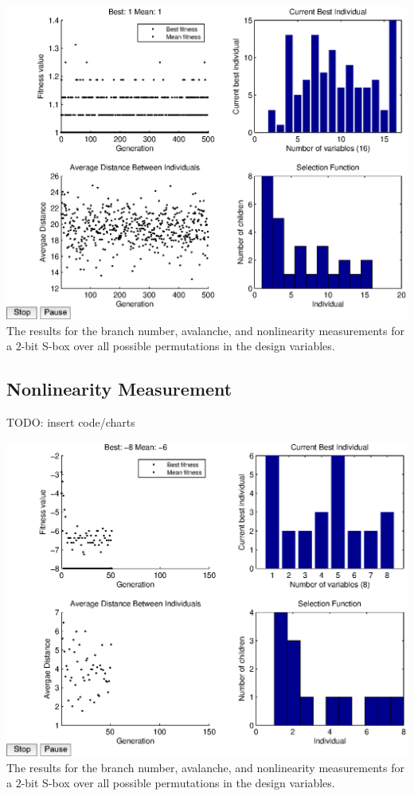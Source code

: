 \documentclass[11pt]{article}
\begin{document}
\begin{center}
	\includegraphics[scale=0.75]{images/bn_results16.eps} \\
	\label{bfjoint}
The results for the branch number, avalanche, and nonlinearity measurements for a $2$-bit S-box over all possible permutations in the design variables. 
\end{center}

\subsection{Nonlinearity Measurement}
TODO: insert code/charts

\begin{center}
	\includegraphics[scale=0.75]{images/nl_results8.eps} \\
	\label{bfjoint}
The results for the branch number, avalanche, and nonlinearity measurements for a $2$-bit S-box over all possible permutations in the design variables. 
\end{center}
\end{document}
